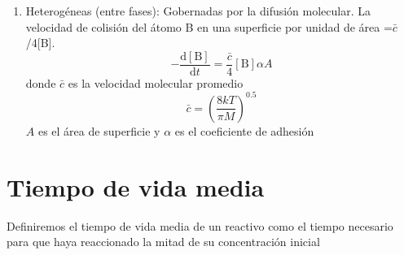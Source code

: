 \begin{enumerate}
En la atm\'osfera superior las reacciones termoleculares son m\'as comunes  ah\'{\i} las densidades de mol\'eculas son m\'as bajas y,  la probabilidad de colisiones m\'ultiples aumentan. Estas reacciones juegan un papel importante en la qu\'{\i}mica atmosf\'erica, ya que contribuyen a la formaci\'on y degradaci\'on de diferentes especies qu\'{\i}micas.

Hay que considerar que las reacciones termoleculares pueden ser altamente dependientes de la energ\'{\i}a y la temperatura. La energ\'{\i}a necesaria para superar la barrera de activaci\'on y permitir que las mol\'eculas colisionen de manera efectiva es proporcionada por la radiaci\'on solar en el caso de la atm\'osfera terrestre.

As\'{\i} tenemos que las reacciones termoleculares involucran la colisi\'on de tres o m\'as mol\'eculas para formar productos. Un ejemplo destacado es la formaci\'on de ozono a partir del ox\'{\i}geno molecular. Estas reacciones son importantes para comprender los procesos fotoqu\'{\i}micos y la formaci\'on de diferentes compuestos atmosf\'ericos en la estratosfera y otras regiones de la atm\'osfera.


 \begin{equation*} -\frac{\mathrm{d}[\textrm{A}]}{\mathrm{d}t}=k[\textrm{A}][\textrm{B}][\textrm{C}]
 \end{equation*}
 
 \item Heterog\'eneas (entre fases): Gobernadas por la difusi\'on molecular. La velocidad de colisi\'on del \'atomo B en una superficie por unidad de \'area =$\bar{c}$/4[B]. 
\begin{equation*}
-\frac{\mathrm{d}[\textrm{B}]}{\mathrm{d}t}=\frac{\bar{c}}{4}[\textrm{B}]\alpha A
\end{equation*}
 donde $\bar{c}$ es la velocidad molecular promedio \begin{equation}
\bar{c}=\left(\frac{8kT}{\pi M}\right)^{0.5}
\end{equation}
$A$ es el \'area de superficie y $\alpha$ es el coeficiente de adhesi\'on
\end{enumerate}

\section{Tiempo de vida media}\label{TVDM}
Definiremos el tiempo de vida media de un reactivo como el tiempo necesario para que haya reaccionado la mitad de su concentraci\'on inicial

